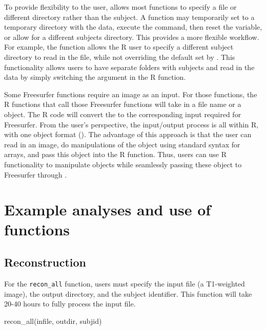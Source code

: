 To provide flexibility to the user,  allows most
functions to specify a file or different directory rather than the
subject. A function may temporarily set  to a
temporary directory with the data, execute the command, then reset the
 variable, or allow for a different subjects
directory. This provides a more flexible workflow. For example, the
  function allows the R user to
specify a different subject directory to read in the file, while not
overriding the default set by . This functionality
allows users to have separate folders with subjects and read in the data
by simply switching the  argument in the R function.

Some Freesurfer functions require an image as an input. For those
functions, the R  functions that call those Freesurfer
functions will take in a file name or a  object. The R code
will convert the  to the corresponding input required for
Freesurfer. From the user's perspective, the input/output process is all
within R, with one object format (). The advantage of this
approach is that the user can read in an image, do manipulations of the
 object using standard syntax for arrays, and pass this
object into the  R function. Thus, users can use R
functionality to manipulate objects while seamlessly passing these
object to Freesurfer through .

\section{Example analyses and use of
functions}\label{example-analyses-and-use-of-functions}

\subsection{Reconstruction}\label{reconstruction}

For the \texttt{recon\_all} function, users must specify the input file
(a T1-weighted image), the output directory, and the subject identifier.
This function will take 20-40 hours to fully process the input file.

\begin{Schunk}
\begin{Sinput}
recon_all(infile, outdir, subjid)
\end{Sinput}
\end{Schunk}

